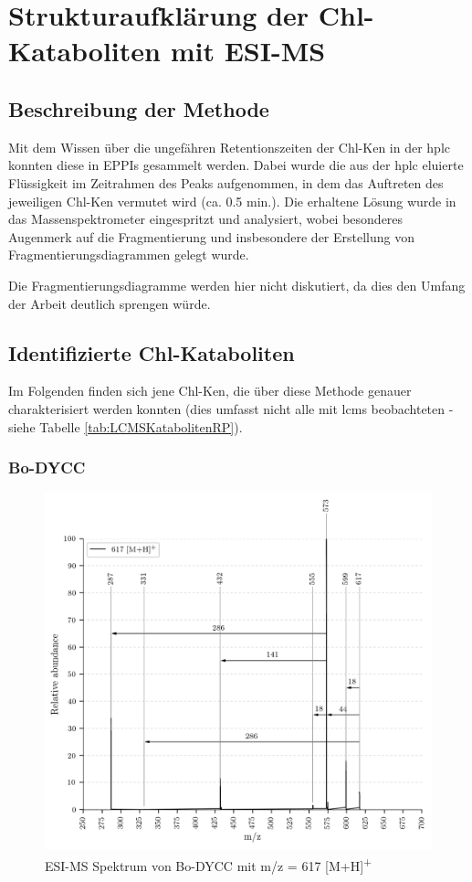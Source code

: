 \chapter{Strukturaufklärung der Chl-Kataboliten mit ESI-MS} \label{sec:ChlKatabolitenESIMS}

\section{Beschreibung der Methode}

Mit dem Wissen über die ungefähren Retentionszeiten der \gls{Chl-K}en in der \gls{hplc} konnten diese in EPPIs gesammelt werden. Dabei wurde die aus der \gls{hplc} eluierte Flüssigkeit im Zeitrahmen des Peaks aufgenommen, in dem das Auftreten des jeweiligen \gls{Chl-K}en vermutet wird (ca. 0.5 min.). Die erhaltene Lösung wurde in das Massenspektrometer eingespritzt und analysiert, wobei besonderes Augenmerk auf die Fragmentierung und insbesondere der Erstellung von Fragmentierungsdiagrammen gelegt wurde. 

Die Fragmentierungsdiagramme werden hier nicht diskutiert, da dies den Umfang der Arbeit deutlich sprengen würde. 

\section{Identifizierte Chl-Kataboliten}

Im Folgenden finden sich jene \gls{Chl-K}en, die über diese Methode genauer charakterisiert werden konnten (dies umfasst nicht alle mit \gls{lcms} beobachteten - siehe Tabelle \ref{tab:LCMSKatabolitenRP}). 

\subsection{Bo-DYCC}

\begin{figure}[!htbp]
  \centering
  \includegraphics[width=\textwidth, height=0.6\textwidth]{figures/Kapitel7/Kataboliten/VWA_MS_617.png}
  \caption[ESI-MS Spektrum von Bo-DYCC, Quelle: Autor]{ESI-MS Spektrum von Bo-DYCC mit m/z = 617 [M+H]\textsuperscript{+}}
  \label{fig:617MH}
\end{figure}


